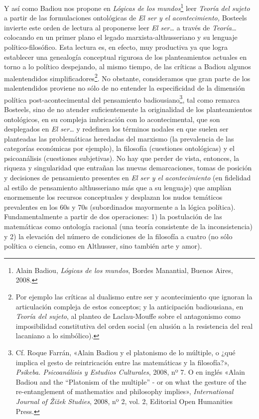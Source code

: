 Y así como Badiou nos propone en \emph{Lógicas de los mundos}\footnote{Alain Badiou, \emph{Lógicas de los mundos}, Bordes Manantial, Buenos Aires, 2008.} leer \emph{Teoría del sujeto} a partir de las formulaciones ontológicas de \emph{El ser y el acontecimiento,} Bosteels invierte este orden de lectura al proponerse leer \emph{El ser\ldots{}} a través de \emph{Teoría\ldots{}} colocando en un primer plano el legado marxista-althusseriano y su lenguaje político-filosófico. Esta lectura es, en efecto, muy productiva ya que logra establecer una genealogía conceptual rigurosa de los planteamientos actuales en torno a lo político despejando, al mismo tiempo, de las críticas a Badiou algunos malentendidos simplificadores\footnote{Por ejemplo las críticas al dualismo entre ser y acontecimiento que ignoran la articulación compleja de estos conceptos; y la anticipación badiousiana, en \emph{Teoría del sujeto}, al planteo de Laclau-Mouffe sobre el antagonismo como imposibilidad constitutiva del orden social (en alusión a la resistencia del real lacaniano a lo simbólico).}. No obstante, consideramos que gran parte de los malentendidos proviene no sólo de no entender la especificidad de la dimensión política post-acontecimental del pensamiento badiousiano\footnote{Cf. Roque Farrán, «Alain Badiou y el platonismo de lo múltiple, o ¿qué implica el gesto de reintricación entre las matemáticas y la filosofía?», \emph{Psikeba. Psicoanálisis y Estudios Culturales}, 2008, nº 7. O en inglés «Alain Badiou and the ``Platonism of the multiple'' - or on what the gesture of the re-entanglement of mathematics and philosophy implies», \emph{International Journal of Žižek Studies}, 2008, nº 2, vol. 2, Editorial Open Humanities Press.}, tal como remarca Bosteels, sino de no atender suficientemente la originalidad de los planteamientos ontológicos, en su compleja imbricación con lo acontecimental, que son desplegados en \emph{El ser\ldots{}} y redefinen los términos nodales en que suelen ser planteadas las problemáticas heredadas del marxismo (la prevalencia de las categorías económicas por ejemplo), la filosofía (cuestiones ontológicas) y el psicoanálisis (cuestiones subjetivas). No hay que perder de vista, entonces, la riqueza y singularidad que entrañan las nuevas demarcaciones, tomas de posición y decisiones de pensamiento presentes en \emph{El ser y el acontecimiento} (en fidelidad al estilo de pensamiento althusseriano más que a su lenguaje) que amplían enormemente los recursos conceptuales y desplazan los nudos temáticos prevalentes en los 60s y 70s (subordinados mayormente a la lógica política). Fundamentalmente a partir de dos operaciones: 1) la postulación de las matemáticas como ontología racional (una teoría consistente de la inconsistencia) y 2) la elevación del número de condiciones de la filosofía a cuatro (no sólo política o ciencia, como en Althusser, sino también arte y amor).

